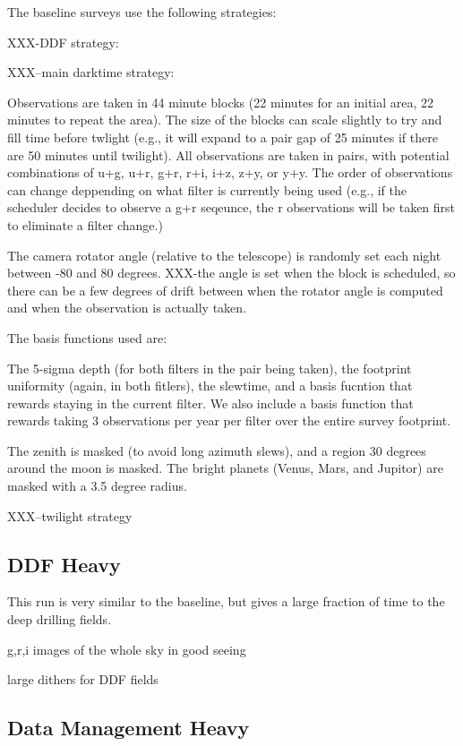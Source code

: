 The baseline surveys use the following strategies:

XXX-DDF strategy:


XXX--main darktime strategy: 

Observations are taken in 44 minute blocks (22 minutes for an initial area, 22 minutes to repeat the area). The size of the blocks can scale slightly to try and fill time before twlight (e.g., it will expand to a pair gap of 25 minutes if there are 50 minutes until twilight). All observations are taken in pairs, with potential combinations of u+g, u+r, g+r, r+i, i+z, z+y, or y+y. The order of observations can change deppending on what filter is currently being used (e.g., if the scheduler decides to observe a g+r seqeunce, the r observations will be taken first to eliminate a filter change.)

The camera rotator angle (relative to the telescope) is randomly set each night between -80 and 80 degrees.  XXX-the angle is set when the block is scheduled, so there can be a few degrees of drift between when the rotator angle is computed and when the observation is actually taken.

The basis functions used are:

The 5-sigma depth (for both filters in the pair being taken), the footprint uniformity (again, in both fitlers), the slewtime, and a basis fucntion that rewards staying in the current filter.  We also include a basis function that rewards taking 3 observations per year per filter over the entire survey footprint.  

The zenith is masked (to avoid long azimuth slews), and a region 30 degrees around the moon is masked. The bright planets (Venus, Mars, and Jupitor) are masked with a 3.5 degree radius. 

XXX--twilight strategy

\subsection{DDF Heavy}

This run is very similar to the baseline, but gives a large fraction of time to the deep drilling fields.

g,r,i images of the whole sky in good seeing

large dithers for DDF fields

\subsection{Data Management Heavy}

